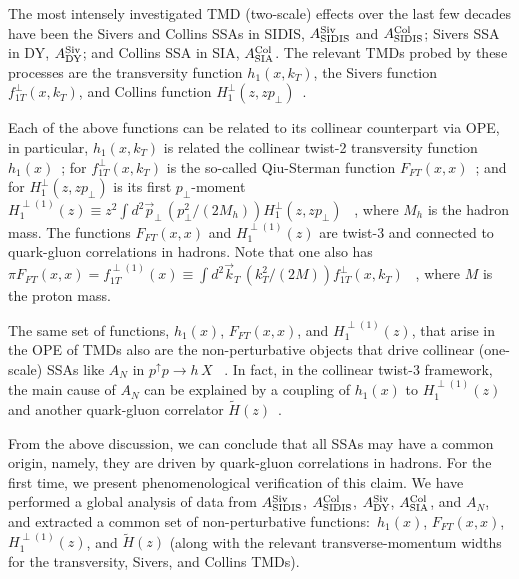 \documentclass[twocolumn,prl,aps,superscriptaddress
               ,footinbib,amsfonts,amsmath,amssymb,showpacs]{revtex4-1}
\begin{document}
\vspace{0.1cm}
%  
The most intensely investigated TMD (two-scale) effects over the last
few decades have been the Sivers and Collins SSAs in SIDIS, 
$A_{\rm SIDIS}^{\rm Siv}$ 
and 
$A_{\rm SIDIS}^{\rm Col}$; 
Sivers SSA in DY,
$A_{\rm DY}^{\rm Siv}$; 
and Collins SSA in SIA, 
$A_{\rm SIA}^{\rm Col}$.  
The relevant TMDs probed by these processes are the
transversity function $h_1(x,k_T)$, the Sivers function
$f_{1T}^\perp(x,k_T)$, and Collins function
$H_{1}^\perp(z,zp_\perp)$~\cite{Mulders:1995dh, Boer:1997mf,
Bacchetta:2006tn, Arnold:2008kf, Pitonyak:2013dsu}.

Each of the above functions  can be related to its collinear counterpart via OPE, in particular,  $h_1(x,k_T)$ is related the collinear
twist-2 transversity function $h_1(x)$~\cite{Bacchetta:2013pqa}; for
$f_{1T}^\perp(x,k_T)$ is the so-called Qiu-Sterman function
$F_{FT}(x,x)$~\cite{Aybat:2011ge}; and for $H_{1}^\perp(z,zp_\perp)$
is its first $p_{\perp}$-moment 
$
H_1^{\perp(1)}(z) 
    \equiv z^2\int d^2 \vec{p}_\perp\,(p_\perp^2/(2M_h))
    H_{1}^\perp(z,zp_\perp)
$
~\cite{Kang:2015msa}, where $M_h$ is the
hadron mass.
%
The functions $F_{FT}(x,x)$ and $H_1^{\perp(1)}(z)$ are
twist-3 and connected to quark-gluon correlations in hadrons.  Note
that one also has 
$
\pi F_{FT}(x,x)=f_{1T}^{\perp(1)}(x)
                \equiv \int d^2 \vec{k}_T\,(k_T^2/(2M)) 
                                f_{1T}^\perp(x,k_T)
$
~\cite{Boer:2003cm}, where $M$ is the proton mass.

The same set of functions, $h_1(x)$, $F_{FT}(x,x)$, and
$H_1^{\perp(1)}(z)$, that arise in the OPE of TMDs also are the
non-perturbative objects that drive collinear (one-scale) SSAs like
$A_N$ in $p^\uparrow p\to h\,X$
~\cite{Qiu:1998ia, Kouvaris:2006zy, Koike:2009ge, Metz:2012ct, Beppu:2013uda}.
%
In fact, in the collinear twist-3 framework, the main cause of $A_N$
can be explained by a coupling of $h_1(x)$ to $H_1^{\perp(1)}(z)$ and
another quark-gluon correlator
$\tilde{H}(z)$~\cite{Kanazawa:2014dca,Gamberg:2017gle}.

From the above discussion, we can conclude that all SSAs may 
have a common origin, namely, they are driven by quark-gluon
correlations in hadrons.  
%
For the first time, we present phenomenological verification
of this claim.  We have performed a global analysis of data from
$A_{\rm SIDIS}^{\rm Siv}$, $A_{\rm SIDIS}^{\rm Col}$, $A_{\rm DY}^{\rm
Siv}$, $A_{\rm SIA}^{\rm Col}$, and $A_N$, and extracted a common set
of non-perturbative functions:~$h_1(x)$, $F_{FT}(x,x)$,
$H_1^{\perp(1)}(z)$, and $\tilde{H}(z)$ (along with the relevant
transverse-momentum widths for the transversity, Sivers, and Collins
TMDs).
\end{document}
